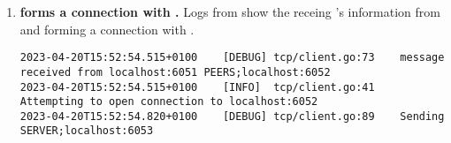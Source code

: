 \begin{enumerate}[itemsep=2.5pt]
  \item \textbf{ forms a connection with .}
  Logs from  show the receing 's information from  and forming a connection with .

\begin{lstlisting}[breaklines=true, postbreak=\mbox{\textcolor{red}{$\hookrightarrow$}\space}]
2023-04-20T15:52:54.515+0100	[DEBUG]	tcp/client.go:73	message received from localhost:6051 PEERS;localhost:6052
2023-04-20T15:52:54.515+0100	[INFO]	tcp/client.go:41	Attempting to open connection to localhost:6052
2023-04-20T15:52:54.820+0100	[DEBUG]	tcp/client.go:89	Sending SERVER;localhost:6053
\end{lstlisting}

\end{enumerate}